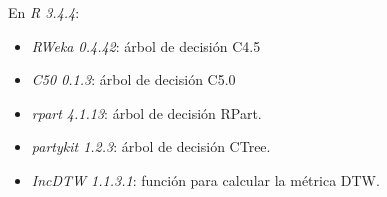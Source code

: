 En \emph{R 3.4.4}:

\begin{itemize}
  \item \emph{RWeka 0.4.42}: árbol de decisión C4.5
  \item \emph{C50 0.1.3}: árbol de decisión C5.0
  \item \emph{rpart 4.1.13}: árbol de decisión RPart.
  \item \emph{partykit 1.2.3}: árbol de decisión CTree.
  \item \emph{IncDTW 1.1.3.1}: función para calcular la métrica DTW.
\end{itemize}

\endinput
